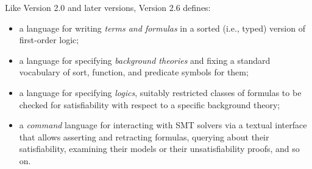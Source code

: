Like Version 2.0 and later versions, Version 2.6 defines:
\begin{itemize}
\item
a language for writing \emph{terms and formulas} in a sorted (i.e., typed) 
version of first-order logic;
\item
a language for specifying \emph{background theories} and 
fixing a standard vocabulary of sort, function, and predicate symbols for them;
\item
a language for specifying \emph{logics}, 
suitably restricted classes of formulas to be checked 
for satisfiability with respect to a specific background theory;
\item
a \emph{command} language for interacting with SMT solvers
via a textual interface
that allows asserting and retracting formulas, 
querying about their satisfiability, examining their models or 
their unsatisfiability proofs, and so on.

\end{itemize}


